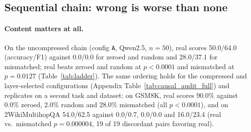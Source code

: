 \documentclass[11pt]{article}
\begin{document}
\subsection{Sequential chain: wrong is worse than none}

\paragraph{Content matters at all.} On the uncompressed chain
(config \texttt{A}, Qwen2.5, $n{=}50$), real scores 50.0/64.0
(accuracy/F1) against 0.0/0.0 for zeroed and random and 28.0/37.1 for
mismatched; real beats zeroed and random at $p<0.0001$ and mismatched at
$p=0.0127$ (Table~\ref{tab:ladder}). The same ordering holds for the
compressed and layer-selected configurations (Appendix
Table~\ref{tab:causal_audit_full}) and replicates on a second task and
dataset: on GSM8K, real scores 90.0\% against 0.0\% zeroed, 2.0\% random and
28.0\% mismatched (all $p<0.0001$), and on 2WikiMultihopQA 54.0/62.5 against
0.0/0.7, 0.0/0.0 and 16.0/23.4 (real vs.\ mismatched $p=0.000004$, 19 of 19
discordant pairs favoring real).
\end{document}
